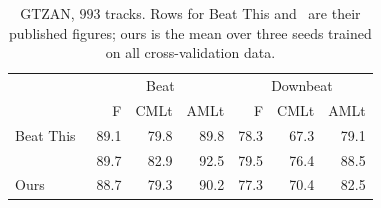 \begin{table}[t]
  \centering
  \caption{GTZAN, $993$ tracks. Rows for Beat This and~\cite{foscarin2026masked} are their published figures; ours is the mean over three seeds trained on all cross-validation data.}
  \label{tab:gtzan}
  \begin{tabular}{lrrrrrr}
    \hline
     & \multicolumn{3}{c}{Beat} & \multicolumn{3}{c}{Downbeat} \\
     & F & CMLt & AMLt & F & CMLt & AMLt \\
    \hline
    Beat This~\cite{foscarin2024beat}   & 89.1 & 79.8 & 89.8 & 78.3 & 67.3 & 79.1 \\
    \cite{foscarin2026masked}           & 89.7 & 82.9 & 92.5 & 79.5 & 76.4 & 88.5 \\
    Ours                                & 88.7 & 79.3 & 90.2 & 77.3 & 70.4 & 82.5 \\
    \hline
  \end{tabular}
\end{table}
